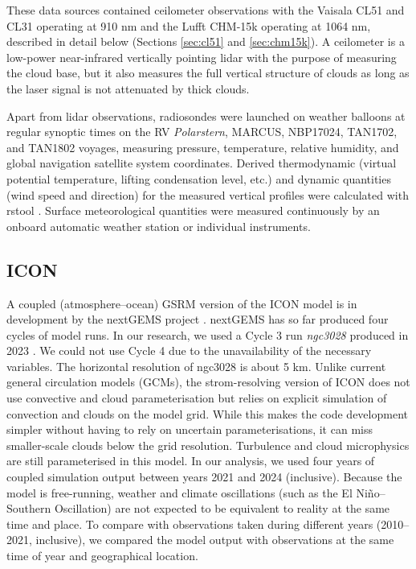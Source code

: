 \documentclass[12pt,a4paper]{article}
\begin{document}
These data sources contained ceilometer observations with the Vaisala CL51 and
CL31 operating at 910 nm and the Lufft CHM-15k operating at 1064 nm, described
in detail below (Sections \ref{sec:cl51} and \ref{sec:chm15k}). A ceilometer is
a low-power near-infrared vertically pointing lidar with the purpose of
measuring the cloud base, but it also measures the full vertical structure of
clouds as long as the laser signal is not attenuated by thick clouds.

Apart from lidar observations, radiosondes were launched on weather balloons at
regular synoptic times on the RV \emph{Polarstern}, MARCUS, NBP17024, TAN1702,
and TAN1802 voyages, measuring pressure, temperature, relative humidity, and
global navigation satellite system coordinates. Derived thermodynamic (virtual
potential temperature, lifting condensation level, etc.) and dynamic quantities
(wind speed and direction) for the measured vertical profiles were calculated
with rstool \citep{rstool}. Surface meteorological quantities were measured
continuously by an onboard automatic weather station or individual instruments.

\subsection{ICON}

A coupled (atmosphere--ocean) GSRM version of the ICON model is in development
by the nextGEMS project \citep{hohenegger2023}. nextGEMS has so far produced
four cycles of model runs. In our research, we used a Cycle 3 run
\emph{ngc3028} produced in 2023 \citep{nextgems2023a,nextgems2023b}. We could
not use Cycle 4 due to the unavailability of the necessary variables. The
horizontal resolution of ngc3028 is about 5 km.  Unlike current general
circulation models (GCMs), the strom-resolving version of ICON does not use
convective and cloud parameterisation but relies on explicit simulation of
convection and clouds on the model grid. While this makes the code development
simpler without having to rely on uncertain parameterisations, it can miss
smaller-scale clouds below the grid resolution.  Turbulence and cloud
microphysics are still parameterised in this model. In our analysis, we used
four years of coupled simulation output between years 2021 and 2024
(inclusive). Because the model is free-running, weather and climate
oscillations (such as the El Niño--Southern Oscillation) are not expected to be
equivalent to reality at the same time and place. To compare with observations
taken during different years (2010--2021, inclusive), we compared the model
output with observations at the same time of year and geographical location.
\end{document}
